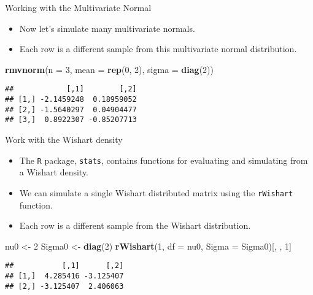\documentclass[ignorenonframetext,]{beamer}
\newenvironment{Shaded}{\begin{snugshade}}{\end{snugshade}}
\newcommand{\KeywordTok}[1]{\textcolor[rgb]{0.13,0.29,0.53}{\textbf{#1}}}
\newcommand{\DataTypeTok}[1]{\textcolor[rgb]{0.13,0.29,0.53}{#1}}
\newcommand{\DecValTok}[1]{\textcolor[rgb]{0.00,0.00,0.81}{#1}}
\newcommand{\StringTok}[1]{\textcolor[rgb]{0.31,0.60,0.02}{#1}}
\newcommand{\NormalTok}[1]{#1}
\providecommand{\tightlist}{%
  \setlength{\itemsep}{0pt}\setlength{\parskip}{0pt}}
\begin{document}
\begin{frame}[fragile]{Working with the Multivariate Normal}

\begin{itemize}
\tightlist
\item
  Now let's simulate many multivariate normals.
\item
  Each row is a different sample from this multivariate normal
  distribution.
\end{itemize}

\begin{Shaded}
\begin{Highlighting}[]
\KeywordTok{rmvnorm}\NormalTok{(}\DataTypeTok{n =} \DecValTok{3}\NormalTok{, }\DataTypeTok{mean =} \KeywordTok{rep}\NormalTok{(}\DecValTok{0}\NormalTok{, }\DecValTok{2}\NormalTok{), }\DataTypeTok{sigma =} \KeywordTok{diag}\NormalTok{(}\DecValTok{2}\NormalTok{))}
\end{Highlighting}
\end{Shaded}

\begin{verbatim}
##            [,1]        [,2]
## [1,] -2.1459248  0.18959052
## [2,] -1.5640297  0.04904477
## [3,]  0.8922307 -0.85207713
\end{verbatim}

\end{frame}

\begin{frame}[fragile]{Work with the Wishart density}

\begin{itemize}
\item
  The \texttt{R} package, \texttt{stats}, contains functions for
  evaluating and simulating from a Wishart density.
\item
  We can simulate a single Wishart distributed matrix using the
  \texttt{rWishart} function.
\item
  Each row is a different sample from the Wishart distribution.
\end{itemize}

\begin{Shaded}
\begin{Highlighting}[]
\NormalTok{nu0 <-}\StringTok{ }\DecValTok{2}
\NormalTok{Sigma0 <-}\StringTok{ }\KeywordTok{diag}\NormalTok{(}\DecValTok{2}\NormalTok{)}
\KeywordTok{rWishart}\NormalTok{(}\DecValTok{1}\NormalTok{, }\DataTypeTok{df =}\NormalTok{ nu0, }\DataTypeTok{Sigma =}\NormalTok{ Sigma0)[, , }\DecValTok{1}\NormalTok{]}
\end{Highlighting}
\end{Shaded}

\begin{verbatim}
##           [,1]      [,2]
## [1,]  4.285416 -3.125407
## [2,] -3.125407  2.406063
\end{verbatim}

\end{frame}
\end{document}
